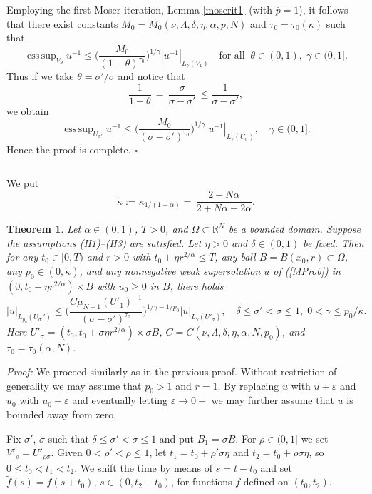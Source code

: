 \documentclass[10pt]{article}
\newtheorem{satz}{Theorem}[section]
\newcommand{\iR}{\mathbb{R}}
\DeclareMathOperator*{\esup}{ess\,sup}
\begin{document}
Employing the first Moser iteration, Lemma \ref{moserit1} (with
$\bar{p}=1$), it follows that there exist constants
$M_0=M_0(\nu,\Lambda,\delta,\eta,\alpha,p,N)$ and
$\tau_0=\tau_0(\kappa)$ such that
\[
\esup_{V_{\theta}}{u^{-1}} \le
\Big(\frac{M_0}{(1-\theta)^{\tau_0}}\Big)^{1/\gamma}
|u^{-1}|_{L_{\gamma}(V_1)}\quad \mbox{for
all}\;\;\theta\in(0,1),\;\gamma\in (0,1] .\] Thus if we take
$\theta=\sigma'/\sigma$ and notice that
\[ \frac{1}{1-\theta}\,=\,\frac{\sigma}{\sigma-\sigma'}\,\le
\frac{1}{\sigma-\sigma'},\] we obtain
\[
\esup_{U_{\sigma'}}{u^{-1}} \le
\Big(\frac{M_0}{(\sigma-\sigma')^{\tau_0}}\Big)^{1/\gamma}
|u^{-1}|_{L_{\gamma}(U_\sigma)},\quad \gamma\in (0,1].
\]
Hence the proof is complete. $\square$

${}$

We put
\[
\tilde{\kappa}:=\kappa_{1/(1-\alpha)}=\,\frac{2+N\alpha}{2+N\alpha-2\alpha}.
\]
\begin{satz} \label{superest2}
Let $\alpha\in(0,1)$, $T>0$, and $\Omega\subset \iR^N$ be a bounded
domain. Suppose the assumptions (H1)--(H3) are satisfied. Let
$\eta>0$ and $\delta\in (0,1)$ be fixed. Then for any $t_0\in [0,T)$
and $r>0$ with $t_0+\eta r^{2/\alpha}\le T$, any ball
$B=B(x_0,r)\subset\Omega$, any $p_0\in(0,\tilde{\kappa})$, and any
nonnegative weak supersolution $u$ of (\ref{MProb}) in $(0,t_0+\eta
r^{2/\alpha})\times B$ with $u_0\ge 0$ in $B$, there holds
\[
|u|_{L_{p_0}(U_{\sigma'}')}\le \Big(\frac{C\mu_{N+1}(U'_1)^{-1}
}{(\sigma-\sigma')^{\tau_0}}\Big)^{1/\gamma-1/p_0}
|u|_{L_{\gamma}(U'_\sigma)},\quad \delta\le \sigma'<\sigma\le 1,\;
0<\gamma\le p_0/\tilde{\kappa}.
\]
Here $U'_\sigma=(t_0,t_0+\sigma\eta r^{2/\alpha})\times \sigma B$,
$C=C(\nu,\Lambda,\delta,\eta,\alpha,N,p_0)$, and
$\tau_0=\tau_0(\alpha,N)$.
\end{satz}
{\em Proof:} We proceed similarly as in the previous proof.
Without restriction of generality we may assume that $p_0>1$ and
$r=1$. By replacing $u$ with $u+\varepsilon$ and $u_0$ with
$u_0+\varepsilon$ and eventually letting $\varepsilon \to 0+$ we
may further assume that $u$ is bounded away from zero.

Fix $\sigma'$, $\sigma$ such that $\delta\le \sigma'<\sigma\le 1$
and put $B_1=\sigma B$. For $\rho\in (0,1]$ we set
$V'_\rho=U'_{\rho\sigma}$. Given $0<\rho'<\rho\le 1$, let
$t_1=t_0+\rho'\sigma\eta$ and $t_2=t_0+\rho\sigma\eta$, so $0\le
t_0<t_1<t_2$. We shift the time by means of ${s}=t-t_0$ and set
$\tilde{f}(s)=f(s+t_0)$, $s\in (0,t_2-t_0)$, for functions $f$
defined on $(t_0,t_2)$.
\end{document}
